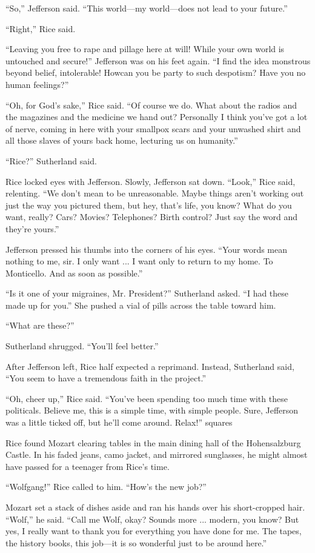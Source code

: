 “So,” Jefferson said. “This world—my world—does not lead to your future.”

“Right,” Rice said.

“Leaving you free to rape and pillage here at will! While your own world is untouched and secure!” Jefferson was on his feet again. “I find the idea monstrous beyond belief, intolerable! Howcan you be party to such despotism? Have you no human feelings?”

“Oh, for God’s sake,” Rice said. “Of course we do. What about the radios and the magazines and the medicine we hand out? Personally I think you’ve got a lot of nerve, coming in here with your smallpox scars and your unwashed shirt and all those slaves of yours back home, lecturing us on humanity.”

“Rice?” Sutherland said.

Rice locked eyes with Jefferson. Slowly, Jefferson sat down. “Look,” Rice said, relenting. “We don’t mean to be unreasonable. Maybe things aren’t working out just the way you pictured them, but hey, that’s life, you know? What do you want, really? Cars? Movies? Telephones? Birth control? Just say the word and they’re yours.”

Jefferson pressed his thumbs into the corners of his eyes. “Your words mean nothing to me, sir. I only want ... I want only to return to my home. To Monticello. And as soon as possible.”

“Is it one of your migraines, Mr. President?” Sutherland asked. “I had these made up for you.” She pushed a vial of pills across the table toward him.

“What are these?”

Sutherland shrugged. “You’ll feel better.”

After Jefferson left, Rice half expected a reprimand. Instead, Sutherland said, “You seem to have a tremendous faith in the project.”

“Oh, cheer up,” Rice said. “You’ve been spending too much time with these politicals. Believe me, this is a simple time, with simple people. Sure, Jefferson was a little ticked off, but he’ll come around. Relax!”
squares

Rice found Mozart clearing tables in the main dining hall of the Hohensalzburg Castle. In his faded jeans, camo jacket, and mirrored sunglasses, he might almost have passed for a teenager from Rice’s time.

“Wolfgang!” Rice called to him. “How’s the new job?”

Mozart set a stack of dishes aside and ran his hands over his short-cropped hair. “Wolf,” he said. “Call me Wolf, okay? Sounds more ... modern, you know? But yes, I really want to thank you for everything you have done for me. The tapes, the history books, this job—it is so wonderful just to be around here.”

